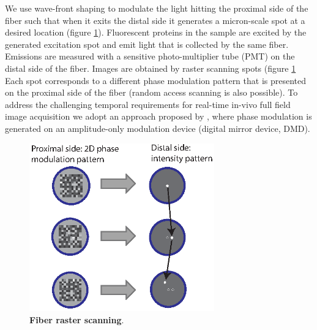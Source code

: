\documentclass[10pt]{article}
\begin{document}
We use wave-front shaping to modulate the light hitting the proximal side of the fiber such that when it exits the distal side it generates a micron-scale spot at a desired location (figure \ref{fig:figure3}). Fluorescent proteins in the sample are excited by the generated excitation spot and emit light that is collected by the same fiber. Emissions are measured with a sensitive photo-multiplier tube (PMT) on the distal side of the fiber.
Images are obtained by raster scanning spots (figure \ref{fig:figure3} Each spot corresponds to a different phase modulation pattern that is presented on the proximal side of the fiber (random access scanning is also possible). To address the challenging temporal requirements for real-time in-vivo full field  image acquisition we adopt an approach proposed by \cite{Conkey2012-qe}, where phase modulation is generated on an amplitude-only modulation device (digital mirror device, DMD).

\begin{figure}
\centering\includegraphics[width=8cm]{figure3}
\caption{\textbf{Fiber raster scanning}.}
\label{fig:figure3}
\end{figure}
\end{document}
